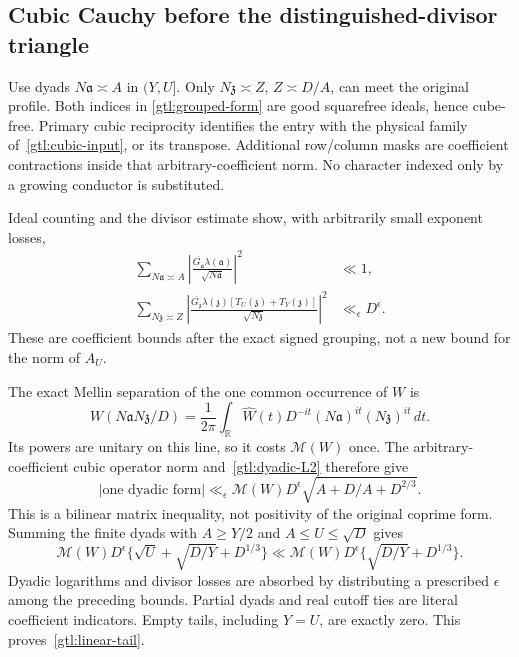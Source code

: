 \subsection{Cubic Cauchy before the distinguished-divisor triangle}
\label{gtl:cubic-proof}
Use dyads $N\mathfrak a\asymp A$ in $(Y,U]$.
Only $N\mathfrak z\asymp Z$, $Z\asymp D/A$,
can meet the original profile. Both indices in
\eqref{gtl:grouped-form} are good squarefree ideals, hence
cube-free. Primary cubic reciprocity identifies the entry
with the physical family of~\eqref{gtl:cubic-input}, or
its transpose. Additional row/column masks are coefficient
contractions inside that arbitrary-coefficient norm.
No character indexed only by a growing conductor is substituted.

Ideal counting and the divisor estimate show, with
arbitrarily small exponent losses,
\begin{equation}\label{gtl:dyadic-L2}
 \begin{aligned}
 \sum_{N\mathfrak a\asymp A}
   \left|\frac{\overline{G_{\mathfrak a}}\lambda(\mathfrak a)}
                    {\sqrt{N\mathfrak a}}\right|^2&\ll1,\\
 \sum_{N\mathfrak z\asymp Z}
   \left|\frac{\overline{G_{\mathfrak z}}\lambda(\mathfrak z)
                    [T_U(\mathfrak z)+T_Y(\mathfrak z)]}
                    {\sqrt{N\mathfrak z}}\right|^2
                                                    &\ll_\epsilon D^\epsilon .
 \end{aligned}
\end{equation}
These are coefficient bounds after the exact signed grouping,
not a new bound for the norm of $A_U$.

The exact Mellin separation of the one common occurrence
of $W$ is
\begin{equation}\label{gtl:Mellin-separation}
 W(N\mathfrak aN\mathfrak z/D)
  =\frac1{2\pi}\int_{\mathbb R}\widehat W(t)D^{-it}
                  (N\mathfrak a)^{it}(N\mathfrak z)^{it}\,dt .
\end{equation}
Its powers are unitary on this line, so it costs
$\mathcal M(W)$ once. The arbitrary-coefficient cubic
operator norm and~\eqref{gtl:dyadic-L2} therefore give
\begin{equation}\label{gtl:dyadic-column}
 |\text{one dyadic form}|
  \ll_\epsilon \mathcal M(W)D^\epsilon
                \sqrt{A+D/A+D^{2/3}} .
\end{equation}
This is a bilinear matrix inequality, not positivity of
the original coprime form.
Summing the finite dyads with $A\ge Y/2$ and
$A\le U\le\sqrt D$ gives
\begin{equation}\label{gtl:summed-column}
 \mathcal M(W)D^\epsilon
       \{\sqrt U+\sqrt{D/Y}+D^{1/3}\}
 \ll\mathcal M(W)D^\epsilon
       \{\sqrt{D/Y}+D^{1/3}\}.
\end{equation}
Dyadic logarithms and divisor losses are absorbed by
distributing a prescribed $\epsilon$ among the preceding
bounds. Partial dyads and real cutoff ties are literal
coefficient indicators. Empty tails, including $Y=U$,
are exactly zero. This proves~\eqref{gtl:linear-tail}.

